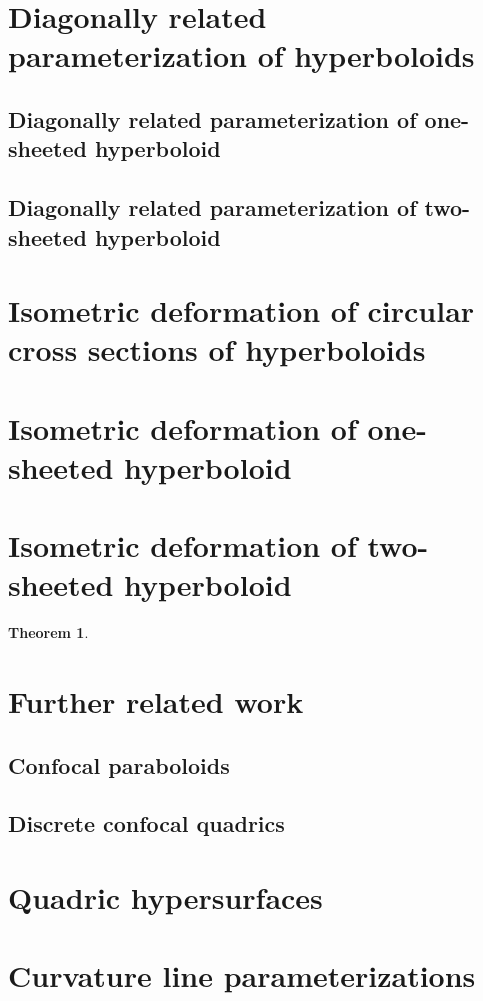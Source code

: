 \documentclass[12pt,a4paper]{article}
\theoremstyle{BoldTopSpacing}
\newtheorem{theorem}{Theorem}[section]
\theoremstyle{BoldTopSpacing}
\theoremstyle{BoldTopSpacing}
\theoremstyle{BoldTopBottomSpacing}
\theoremstyle{BoldTopSpacing}
\theoremstyle{BoldTopBottomSpacing}
\theoremstyle{remark}
\begin{document}
\section{Diagonally related parameterization of hyperboloids}
\subsection{Diagonally related parameterization of one-sheeted hyperboloid}
\subsection{Diagonally related parameterization of two-sheeted hyperboloid}
\pagebreak
\section{Isometric deformation of circular cross sections of hyperboloids}
\section{Isometric deformation of one-sheeted hyperboloid}
\section{Isometric deformation of two-sheeted hyperboloid}
\begin{theorem}
\label{thm:affine-transformation-hyperboloid}

\end{theorem}
\section{Further related work}
\label{sec:further-related-work}
\subsection{Confocal paraboloids}
\label{subsec:confocal-paraboloids}
\subsection{Discrete confocal quadrics}
\label{subsec:discrete-confocal-quadrics}
\pagebreak
\appendix
\section{Quadric hypersurfaces}
\label{appendix:quadrics}
\pagebreak
\section{Curvature line parameterizations}
\label{appendix:curvature-lines}
\pagebreak


\pagestyle{tocstyle}


\end{document}
